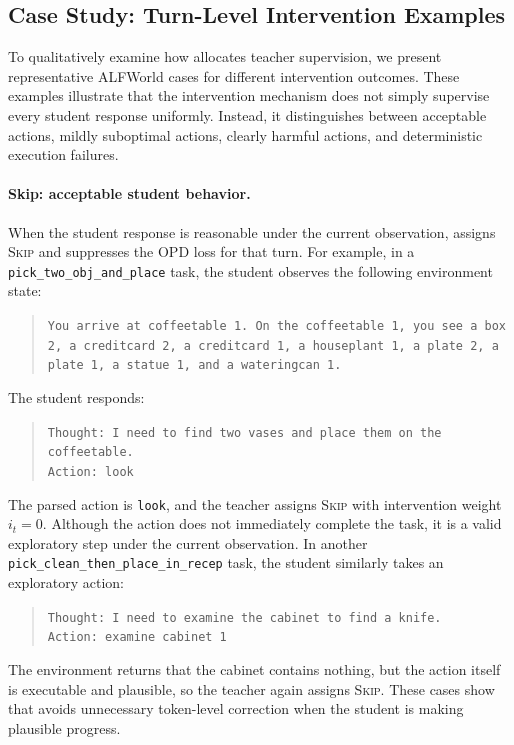 \subsection{Case Study: Turn-Level Intervention Examples}
\label{sec:case_study}

To qualitatively examine how \ours{} allocates teacher supervision, we present representative ALFWorld cases for different intervention outcomes.
%
These examples illustrate that the intervention mechanism does not simply supervise every student response uniformly.
%
Instead, it distinguishes between acceptable actions, mildly suboptimal actions, clearly harmful actions, and deterministic execution failures.

\paragraph{Skip: acceptable student behavior.}
When the student response is reasonable under the current observation, \ours{} assigns \textsc{Skip} and suppresses the OPD loss for that turn.
%
For example, in a \texttt{pick\_two\_obj\_and\_place} task, the student observes the following environment state:
%
\begin{quote}
\small
\texttt{You arrive at coffeetable 1. On the coffeetable 1, you see a box 2, a creditcard 2, a creditcard 1, a houseplant 1, a plate 2, a plate 1, a statue 1, and a wateringcan 1.}
\end{quote}
%
The student responds:
%
\begin{quote}
\small
\texttt{Thought: I need to find two vases and place them on the coffeetable.}\\
\texttt{Action: look}
\end{quote}
%
The parsed action is \texttt{look}, and the teacher assigns \textsc{Skip} with intervention weight $i_t=0$.
%
Although the action does not immediately complete the task, it is a valid exploratory step under the current observation.
%
In another \texttt{pick\_clean\_then\_place\_in\_recep} task, the student similarly takes an exploratory action:
%
\begin{quote}
\small
\texttt{Thought: I need to examine the cabinet to find a knife.}\\
\texttt{Action: examine cabinet 1}
\end{quote}
%
The environment returns that the cabinet contains nothing, but the action itself is executable and plausible, so the teacher again assigns \textsc{Skip}.
%
These cases show that \ours{} avoids unnecessary token-level correction when the student is making plausible progress.

